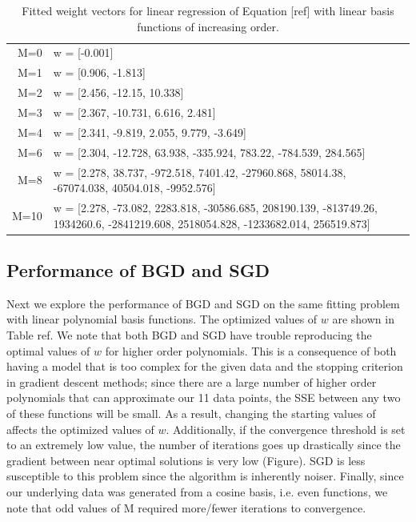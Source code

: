 \documentclass[12pt]{article}
\begin{document}
\begin{table}
\caption{Fitted weight vectors for linear regression of Equation [ref] with linear basis functions of increasing order.}
\begin{center}
\begin{tabular}{r | l}
M=0 &  w =  [-0.001] \\
M=1 &  w =  [0.906, -1.813] \\
M=2 &  w =  [2.456, -12.15, 10.338] \\
M=3 &  w =  [2.367, -10.731, 6.616, 2.481] \\
M=4 &  w =  [2.341, -9.819, 2.055, 9.779, -3.649] \\
M=6 &  w =  [2.304, -12.728, 63.938, -335.924, 783.22, -784.539, 284.565] \\
M=8 &  w =  [2.278, 38.737, -972.518, 7401.42, -27960.868, 58014.38, -67074.038, 40504.018, -9952.576] \\
M=10 &  w =  [2.278, -73.082, 2283.818, -30586.685, 208190.139, -813749.26, 1934260.6, -2841219.608, 2518054.828, -1233682.014, 256519.873] \\
\end{tabular}
\end{center}
\label{poly_weights}
\end{table}


\subsection{Performance of BGD and SGD}

Next we explore the performance of BGD and SGD on the same fitting problem with linear polynomial basis functions. The optimized values of $w$ are shown in Table {ref}. We note that both BGD and SGD have trouble reproducing the optimal values of $w$ for higher order polynomials. This is a consequence of both having a model that is too complex for the given data and the stopping criterion in gradient descent methods; since there are a large number of higher order polynomials that can approximate our 11 data points, the SSE between any two of these functions will be small. As a result, changing the starting values of affects the optimized values of $w$. Additionally, if the convergence threshold is set to an extremely low value, the number of iterations goes up drastically since the gradient between near optimal solutions is very low (Figure). SGD is less susceptible to this problem since the algorithm is inherently noiser. Finally, since our underlying data was generated from a cosine basis, i.e. even functions, we note that odd values of M required more/fewer iterations to convergence.
\end{document}
